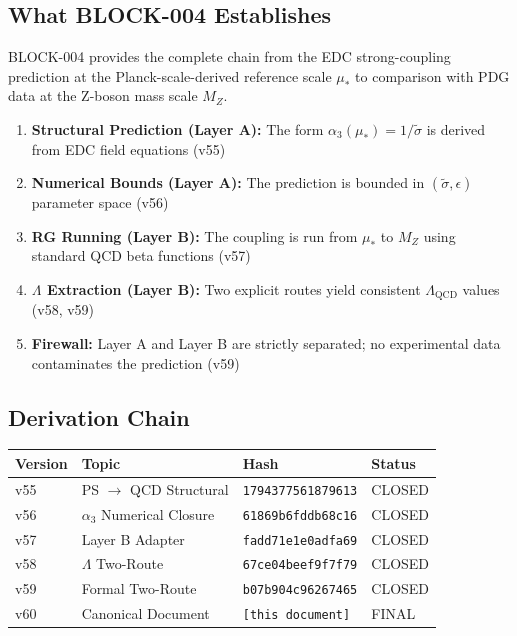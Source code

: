 \documentclass[11pt,a4paper]{article}
\theoremstyle{definition}
\begin{document}
\subsection{What BLOCK-004 Establishes}
\label{subsec:what-established}

BLOCK-004 provides the complete chain from the EDC strong-coupling prediction
at the Planck-scale-derived reference scale $\mu_*$ to comparison with PDG data
at the Z-boson mass scale $M_Z$.

\begin{canonbox}
\begin{enumerate}
  \item \textbf{Structural Prediction (Layer A):} The form $\alpha_3(\mu_*) = 1/\tilde{\sigma}$
        is derived from EDC field equations (v55)
  \item \textbf{Numerical Bounds (Layer A):} The prediction is bounded in
        $(\tilde{\sigma}, \epsilon)$ parameter space (v56)
  \item \textbf{RG Running (Layer B):} The coupling is run from $\mu_*$ to $M_Z$
        using standard QCD beta functions (v57)
  \item \textbf{$\Lambda$ Extraction (Layer B):} Two explicit routes yield
        consistent $\Lambda_{\text{QCD}}$ values (v58, v59)
  \item \textbf{Firewall:} Layer A and Layer B are strictly separated;
        no experimental data contaminates the prediction (v59)
\end{enumerate}
\end{canonbox}

\subsection{Derivation Chain}
\label{subsec:chain}

\begin{hashbox}
\begin{tabular}{llll}
\toprule
Version & Topic & Hash & Status \\
\midrule
v55 & PS $\to$ QCD Structural & \texttt{1794377561879613} & CLOSED \\
v56 & $\alpha_3$ Numerical Closure & \texttt{61869b6fddb68c16} & CLOSED \\
v57 & Layer B Adapter & \texttt{fadd71e1e0adfa69} & CLOSED \\
v58 & $\Lambda$ Two-Route & \texttt{67ce04beef9f7f79} & CLOSED \\
v59 & Formal Two-Route & \texttt{b07b904c96267465} & CLOSED \\
v60 & Canonical Document & \texttt{[this document]} & FINAL \\
\bottomrule
\end{tabular}
\end{hashbox}
\end{document}
